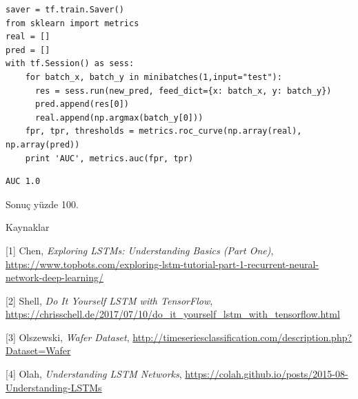 \documentclass[12pt,fleqn]{article}\usepackage{../../common}
\begin{document}
\begin{verbatim}
saver = tf.train.Saver()
from sklearn import metrics
real = []
pred = []
with tf.Session() as sess:
    for batch_x, batch_y in minibatches(1,input="test"):
      res = sess.run(new_pred, feed_dict={x: batch_x, y: batch_y})
      pred.append(res[0])
      real.append(np.argmax(batch_y[0]))
    fpr, tpr, thresholds = metrics.roc_curve(np.array(real), np.array(pred))
    print 'AUC', metrics.auc(fpr, tpr)      
\end{verbatim}                    

\begin{verbatim}
AUC 1.0
\end{verbatim}

Sonuç yüzde 100. 

Kaynaklar

[1] Chen, {\em Exploring LSTMs: Understanding Basics (Part One)}, \url{https://www.topbots.com/exploring-lstm-tutorial-part-1-recurrent-neural-network-deep-learning/}

[2] Shell, {\em Do It Yourself LSTM with TensorFlow}, \url{https://chrisschell.de/2017/07/10/do_it_yourself_lstm_with_tensorflow.html}

[3] Olszewski, {\em Wafer Dataset}, \url{http://timeseriesclassification.com/description.php?Dataset=Wafer}

[4] Olah, {\em Understanding LSTM Networks}, \url{https://colah.github.io/posts/2015-08-Understanding-LSTMs}
\end{document}
